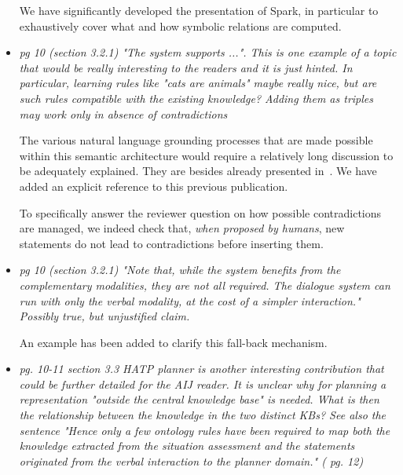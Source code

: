 \documentclass{article}
\begin{document}
\begin{itemize}
        We have
        significantly developed the presentation of {\sc Spark}, in
        particular to exhaustively cover what and how symbolic relations are
        computed.

    \item \emph{pg 10 (section 3.2.1)
            "The system supports ...". This is one example of a topic that would
            be really interesting to the readers and it is just hinted. In
            particular, learning rules like "cats are animals" maybe really
            nice, but are such rules compatible with the existing knowledge?
            Adding them as triples may work only in absence of contradictions}
            
            The various natural language grounding processes that are made
            possible within this semantic architecture would require a
            relatively long discussion to be adequately explained. They are
            besides already presented in~\cite{Lemaignan2011a}.  We have added
            an explicit reference to this previous publication.

            To specifically answer the reviewer question on how possible
            contradictions are managed, we indeed check that, \emph{when
            proposed by humans}, new statements
            do not lead to contradictions before inserting
            them.

    \item \emph{pg 10 (section 3.2.1)
            "Note that, while the system benefits from the complementary
            modalities, they are not all
            required. The dialogue system can run with only the verbal modality,
            at the cost of a simpler interaction."
        Possibly true, but unjustified claim.}
        
        An example has been added to
        clarify this fall-back mechanism.

    \item \emph{pg. 10-11 section 3.3
            HATP planner is another interesting contribution that could be
            further detailed for the AIJ reader. 
            It is unclear why for planning a representation "outside the central
            knowledge base" is needed. What is then the relationship between the
            knowledge in the two distinct KBs?
            See also the sentence "Hence only a few ontology rules have been
            required to map both the  knowledge extracted from the situation assessment and the statements
            originated from the verbal  interaction to the planner domain." ( pg. 12)}


\end{itemize}
\end{document}
